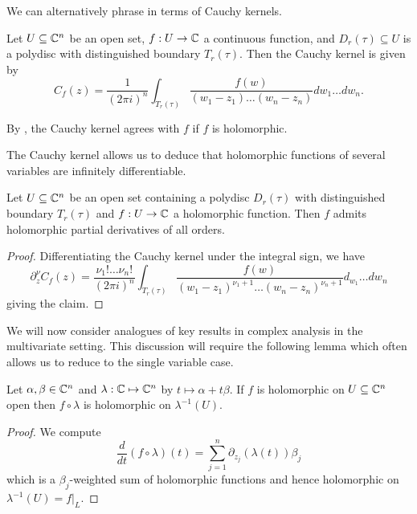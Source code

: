 We can alternatively phrase  in terms of Cauchy kernels. 
\begin{definition}\label{def: cauchy kernel}
    Let $U\subseteq\mathbb{C}^{n}$ be an open set, $f:U\to\mathbb{C}$ a continuous function, and $D_{r}(\tau)\subseteq U$ is a polydisc with distinguished boundary $T_{r}(\tau)$. Then the Cauchy kernel is given by 
    $$C_{f}(z)=\frac{1}{(2\pi i)^{n}}\int_{T_{r}(\tau)}\frac{f(w)}{(w_{1}-z_{1})\dots(w_{n}-z_{n})}dw_{1}\dots dw_{n}.$$
\end{definition}
\begin{remark}
    By , the Cauchy kernel agrees with $f$ if $f$ is holomorphic. 
\end{remark}
The Cauchy kernel allows us to deduce that holomorphic functions of several variables are infinitely differentiable. 
\begin{proposition}\label{prop: multivariate holomorphic are infinitey differentiable}
    Let $U\subseteq\mathbb{C}^{n}$ be an open set containing a polydisc $D_{r}(\tau)$ with distinguished boundary $T_{r}(\tau)$ and $f:U\to\mathbb{C}$ a holomorphic function. Then $f$ admits holomorphic partial derivatives of all orders. 
\end{proposition}
\begin{proof}
    Differentiating the Cauchy kernel under the integral sign, we have 
    $$\partial^{\nu}_{z}C_{f}(z)=\frac{\nu_{1}!\dots\nu_{n}!}{(2\pi i)^{n}}\int_{T_{r}(\tau)}\frac{f(w)}{(w_{1}-z_{1})^{\nu_{1}+1}\dots(w_{n}-z_{n})^{\nu_{n}+1}}d_{w_{1}}\dots dw_{n}$$
    giving the claim. 
\end{proof}
We will now consider analogues of key results in complex analysis in the multivariate setting. This discussion will require the following lemma which often allows us to reduce to the single variable case. 
\begin{lemma}\label{lem: testing holomorphic by lines}
    Let $\alpha,\beta\in\mathbb{C}^{n}$ and $\lambda:\mathbb{C}\mapsto\mathbb{C}^{n}$ by $t\mapsto\alpha+t\beta$. If $f$ is holomorphic on $U\subseteq\mathbb{C}^{n}$ open then $f\circ\lambda$ is holomorphic on $\lambda^{-1}(U)$. 
\end{lemma}
\begin{proof}
    We compute $$\frac{d}{dt}(f\circ\lambda)(t)=\sum_{j=1}^{n}\partial_{z_{j}}(\lambda(t))\beta_{j}$$
    which is a $\beta_{j}$-weighted sum of holomorphic functions and hence holomorphic on $\lambda^{-1}(U)=f|_{L}$. 
\end{proof}
